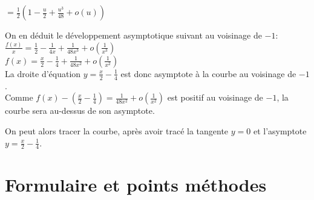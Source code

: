 \begin{Sol}
$
= \frac{1}{2} \left( 1 - \frac{u}{2} + \frac{u^3}{48} + o(u) \right)$

On en déduit le développement asymptotique suivant au voisinage de  $-1$:\\
$
\frac{f(x)}{x} = \frac{1}{2} - \frac{1}{4x} + \frac{1}{48x^3} + o\left( \frac{1}{x^3} \right)
$\\

$f(x) = \frac{x}{2} - \frac{1}{4} + \frac{1}{48x^2} + o\left( \frac{1}{x^2} \right)$\\

La droite d’équation $ y = \frac{x}{2} - \frac{1}{4} $ est donc asymptote à la courbe au voisinage de  $-1$.\\

Comme $ f(x) - \left( \frac{x}{2} - \frac{1}{4} \right) = \frac{1}{48x^2} + o\left( \frac{1}{x^2} \right) $ est positif au voisinage de $ -1$, la courbe sera au-dessus de son asymptote.

On peut alors tracer la courbe, après avoir tracé la tangente $ y = 0$ et l’asymptote $ y = \frac{x}{2} - \frac{1}{4}$.\\
\end{Sol}


\section{Formulaire et points méthodes}
